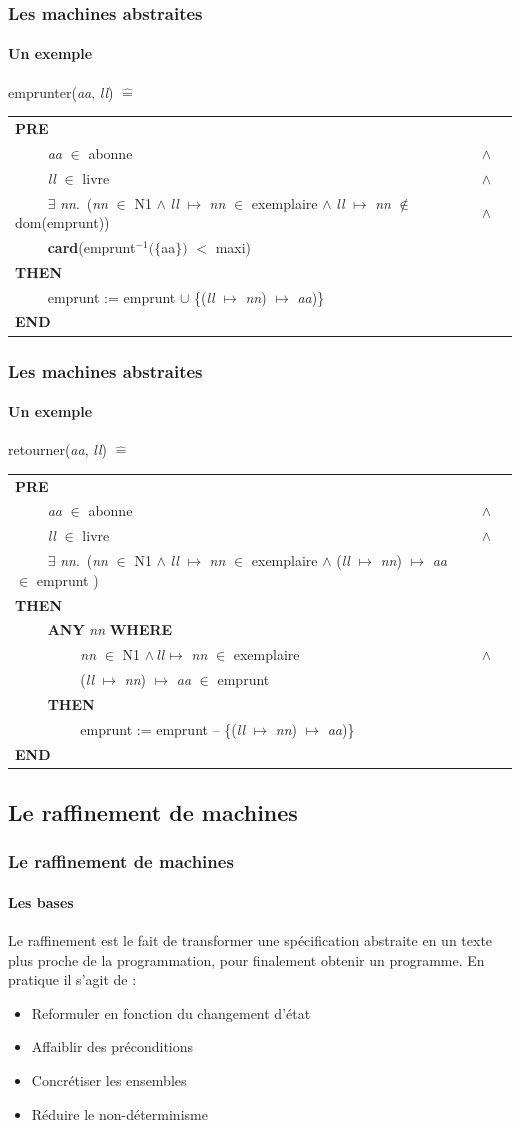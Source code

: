 \documentclass[11pt,a4paper,xcolor=table]{beamer} %
\newcommand{\Bequal}{\mathrel{\widehat{=}}}
\begin{document}
\begin{frame}
\frametitle{Les machines abstraites}
\framesubtitle{Un exemple}
\indent emprunter(\emph{aa}, \emph{ll}) $\Bequal$
\begin{longtable}{lll}
\textbf{PRE} \tabularnewline
~~~~ \emph{aa} $\in$ abonne & $\wedge$ \tabularnewline 
~~~~ \emph{ll} $\in$ livre & $\wedge$ \tabularnewline
~~~~ $\exists$ \emph{nn}.\ (\emph{nn} $\in$ N1 $\wedge$ \emph{ll} $\mapsto$ \emph{nn} $\in$ exemplaire $\wedge$ \emph{ll} $\mapsto$ \emph{nn} $\notin$ dom(emprunt)) & $\wedge$ \tabularnewline
~~~~ \textbf{card}(emprunt$^{-1} (\{$aa$\})$ $<$ maxi) \tabularnewline
\textbf{THEN} \tabularnewline ~~~~ emprunt := emprunt $\cup$ \{(\emph{ll} $\mapsto$ \emph{nn}) $\mapsto$ \emph{aa})\} \tabularnewline
\textbf{END} \tabularnewline
\end{longtable}
\end{frame}

\begin{frame}
\frametitle{Les machines abstraites}
\framesubtitle{Un exemple}
\indent retourner(\emph{aa}, \emph{ll}) $\Bequal$
\begin{longtable}{lll}
\textbf{PRE} \tabularnewline
~~~~ \emph{aa} $\in$ abonne & $\wedge$ \tabularnewline 
~~~~ \emph{ll} $\in$ livre & $\wedge$ \tabularnewline
~~~~ $\exists$ \emph{nn}.\ (\emph{nn} $\in$ N1 $\wedge$ \emph{ll} $\mapsto$ \emph{nn} $\in$ exemplaire $\wedge$ (\emph{ll} $\mapsto$ \emph{nn}) $\mapsto$ \emph{aa} $\in$ emprunt )\tabularnewline
\textbf{THEN} \tabularnewline
~~~~ \textbf{ANY} \emph{nn} \textbf{WHERE} \tabularnewline
~~~~ ~~~~ \emph{nn} $\in$ N1 $\wedge~ll \mapsto$ \emph{nn} $\in$ exemplaire & $\wedge$ \tabularnewline
~~~~ ~~~~ (\emph{ll} $\mapsto$ \emph{nn}) $\mapsto$ \emph{aa} $\in$ emprunt \tabularnewline
~~~~ \textbf{THEN} \tabularnewline
~~~~ ~~~~ emprunt := emprunt -- \{(\emph{ll} $\mapsto$ \emph{nn}) $\mapsto$ \emph{aa})\} \tabularnewline
\textbf{END} \tabularnewline
\end{longtable}
\end{frame}

\subsection{Le raffinement de machines}
\begin{frame}
\frametitle{Le raffinement de machines}
\framesubtitle{Les bases}
Le raffinement est le fait de transformer une spécification abstraite en un texte plus proche de la programmation, pour finalement obtenir un programme.
\pause
En pratique il s'agit de :
\begin{itemize}
\item Reformuler en fonction du changement d'état
\item Affaiblir des préconditions
\item Concrétiser les ensembles
\item Réduire le non-déterminisme
\end{itemize}
\end{frame}
\end{document}
